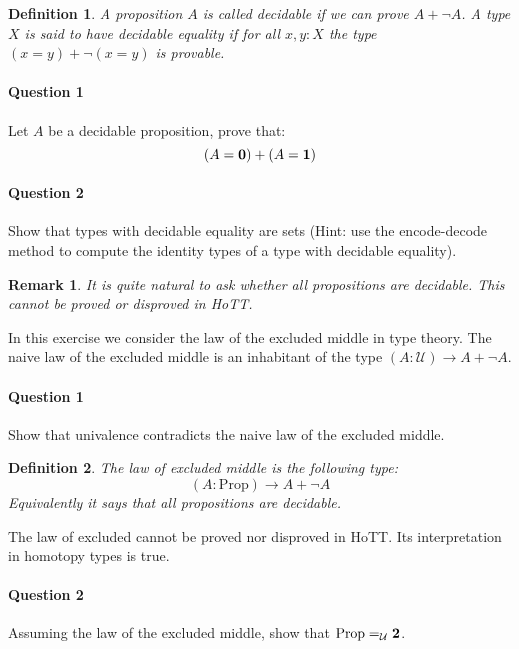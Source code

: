 \documentclass{article}[6pt]%
\newcommand{\U}{{\mathcal U}}
\renewcommand{\r}{\rightarrow}
\newcommand{\one}{{\bf 1}}
\newcommand{\zero}{{\bf 0}}
\newcommand{\two}{{\bf 2}}
\newcommand{\Prop}{\mathrm{Prop}}
\newtheorem{definition}{Definition}
\newtheorem{remark}{Remark}
\begin{document}
\begin{Exercise}[title={Decidable types and propositions}]


\begin{definition}
A proposition $A$ is called decidable if we can prove $A+\lnot A$. A type $X$ is said to have decidable equality if for all $x,y:X$ the type $(x=y)+\lnot(x=y)$ is provable.
\end{definition}

\paragraph{Question 1} Let $A$ be a decidable proposition, prove that:
\[(A=\zero) + (A=\one)\]

\paragraph{Question 2} Show that types with decidable equality are sets (Hint: use the encode-decode method to compute the identity types of a type with decidable equality).

\begin{remark}
It is quite natural to ask whether all propositions are decidable. This cannot be proved or disproved in HoTT.
\end{remark}

\end{Exercise}


\begin{Exercise}[title={The law of the excluded middle}]
In this exercise we consider the law of the excluded middle in type theory. The naive law of the excluded middle is an inhabitant of the type $(A:\U)\r A+\lnot A$.

\paragraph{Question 1} Show that univalence contradicts the naive law of the excluded middle.

\begin{definition}
The law of excluded middle is the following type:
\[(A:\Prop)\r A + \lnot A\]
Equivalently it says that all propositions are decidable.
\end{definition}

The law of excluded cannot be proved nor disproved in HoTT. Its interpretation in homotopy types is true. 

\paragraph{Question 2} Assuming the law of the excluded middle, show that $\Prop =_\U \two$.

\end{Exercise}
\end{document}
